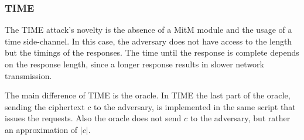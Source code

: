 \subsubsection{TIME}
The TIME attack's novelty is the absence of a MitM module and the usage of a
time side-channel. In this case, the adversary does not have access to the
length but the timings of the responses. The time until the response is complete
depends on the response length, since a longer response results in slower
network transmission.

The main difference of TIME is the oracle. In TIME the last part of the
oracle, sending the ciphertext $c$ to the adversary, is implemented in the same
script that issues the requests. Also the oracle does not send $c$ to the
adversary, but rather an approximation of $\rvert c \rvert$.
